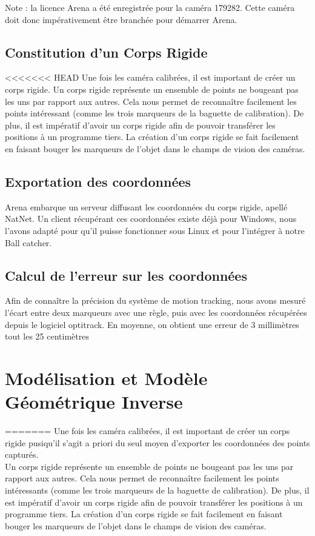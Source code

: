 \documentclass{article}[11pt]
\begin{document}
Note : la licence Arena a été enregistrée pour la caméra 179282. Cette caméra doit donc impérativement être branchée pour démarrer Arena.

\subsection{Constitution d'un Corps Rigide}

<<<<<<< HEAD
Une fois les caméra calibrées, il est important de créer un corps rigide.
Un corps rigide représente un ensemble de points ne bougeant pas les uns par rapport aux autres. Cela nous permet de reconnaître facilement les points intéressant (comme les trois marqueurs de la baguette de calibration). De plus, il est impératif d'avoir un corps rigide afin de pouvoir transférer les positions à un programme tiers. La création d'un corps rigide se fait facilement en faisant bouger les marqueurs de l'objet dans le champs de vision des caméras.

\subsection{Exportation des coordonnées}

Arena embarque un serveur diffusant les coordonnées du corps rigide, apellé NatNet. Un client récupérant ces coordonnées existe déjà pour Windows, nous l'avons adapté pour qu'il puisse fonctionner sous Linux et pour l'intégrer à notre Ball catcher. 

\subsection{Calcul de l'erreur sur les coordonnées}
Afin de connaître la précision du système de motion tracking, nous avons mesuré l'écart entre deux marqueurs avec une règle, puis avec les coordonnées récupérées depuis le logiciel optitrack. En moyenne, on obtient une erreur de 3 millimètres tout les 25 centimètres 
\newpage
\section{Modélisation et Modèle Géométrique Inverse}


=======
Une fois les caméra calibrées, il est important de créer un corps rigide pusiqu'il s'agit a priori du seul moyen d'exporter les coordonnées des points capturés. \\

Un corps rigide représente un ensemble de points ne bougeant pas les uns par rapport aux autres. Cela nous permet de reconnaître facilement les points intéressants (comme les trois marqueurs de la baguette de calibration). De plus, il est impératif d'avoir un corps rigide afin de pouvoir transférer les positions à un programme tiers. La création d'un corps rigide se fait facilement en faisant bouger les marqueurs de l'objet dans le champs de vision des caméras.
\end{document}
